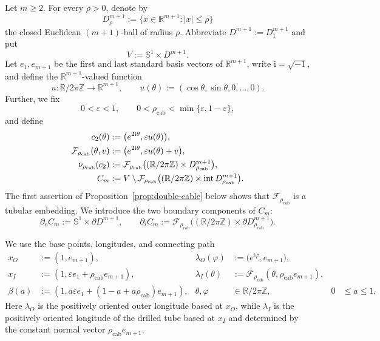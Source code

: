 \documentclass[11pt,reqno]{amsart}
\theoremstyle{definition}
\numberwithin{equation}{section}
\newcommand{\rhoCab}{{\rho_{\mathrm{cab}}}}
\begin{document}
Let $m\ge2$.  For every $\rho>0$, denote by
\[
 D^{m+1}_\rho:=\{x\in\mathbb R^{m+1}:|x|\le\rho\}
\]
the closed Euclidean $(m+1)$-ball of radius $\rho$.  Abbreviate
$D^{m+1}:=D^{m+1}_1$ and put
\[
 V:=\mathbb S^1\times D^{m+1}.
\]
Let $e_1,e_{m+1}$ be the first and last standard basis vectors of
$\mathbb R^{m+1}$, write $\mathrm i=\sqrt{-1}$, and define the
$\mathbb R^{m+1}$-valued function
\[
 u:\mathbb R/2\pi\mathbb Z\longrightarrow\mathbb R^{m+1},
 \qquad
 u(\theta):=(\cos\theta,\sin\theta,0,\ldots,0).
\]
Further, we fix
\[
 0<\varepsilon<1,
 \qquad
 0<\rhoCab<\min\{\varepsilon,1-\varepsilon\},
\]
and define
\begin{align}
 c_2(\theta)
   &:=\bigl(e^{2\mathrm i\theta},\varepsilon u(\theta)\bigr),\label{eq:double-cable}\\
 \mathcal F_{\rhoCab}(\theta,v)
   &:=\bigl(e^{2\mathrm i\theta},\varepsilon u(\theta)+v\bigr),\label{eq:explicit-tube}\\
 \nu_{\rhoCab}(c_2)
   &:=\mathcal F_{\rhoCab}
     \bigl((\mathbb R/2\pi\mathbb Z)\times
                     D^{m+1}_{\rhoCab}\bigr),\notag\\
 C_m
   &:=V\setminus\mathcal F_{\rhoCab}
     \bigl((\mathbb R/2\pi\mathbb Z)\times
              \operatorname{int}D^{m+1}_{\rhoCab}\bigr).\label{eq:explicit-exterior}
\end{align}
The first assertion of Proposition~\ref{prop:double-cable} below shows
that $\mathcal F_{\rhoCab}$ is a tubular embedding.  We introduce the two boundary components of $C_m$:
\[
 \partial_oC_m:=\mathbb S^1\times\partial D^{m+1},
 \qquad
 \partial_iC_m:=\mathcal F_{\rhoCab}
 \bigl((\mathbb R/2\pi\mathbb Z)\times
                         \partial D^{m+1}_{\rhoCab}\bigr).
\]

We use the base points, longitudes, and connecting path
\begin{align*}
 x_O&:=(1,e_{m+1}),
 &\lambda_O(\varphi)&:=\bigl(e^{\mathrm i\varphi},e_{m+1}\bigr),\\
 x_I&:=(1,\varepsilon e_1+\rhoCab e_{m+1}),
 &\lambda_I(\theta)&:=
   \mathcal F_{\rhoCab}(\theta,\rhoCab e_{m+1}),\\
 \beta(a)&:=\left(1,
 a\varepsilon e_1+(1-a+a\rhoCab)e_{m+1}\right),
 &\theta,\varphi&\in\mathbb R/2\pi\mathbb Z,
 &0&\le a\le1.
\end{align*}
Here $\lambda_O$ is the positively oriented outer longitude based at
$x_O$, while $\lambda_I$ is the positively oriented longitude of the
drilled tube based at $x_I$ and determined by the constant normal vector
$\rhoCab e_{m+1}$.
\end{document}
